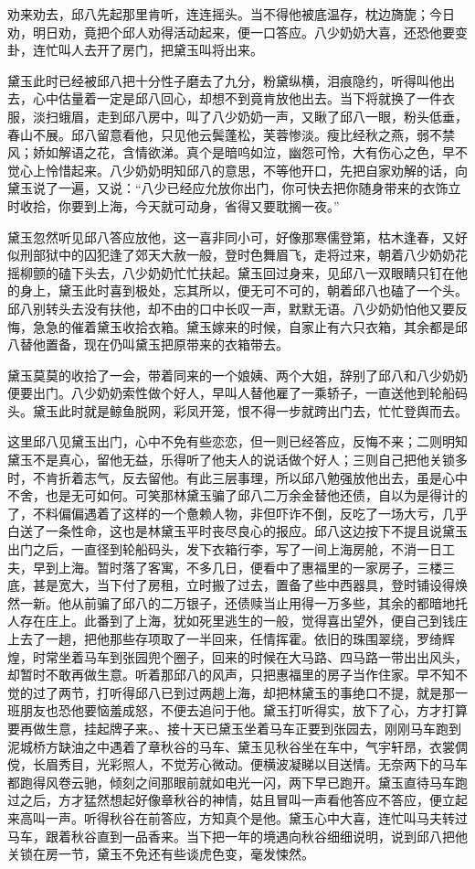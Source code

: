 \documentclass[12pt,UTF8]{ctexbook}
\begin{document}
{{{劝来劝去，邱八先起那里肯听，连连摇头。当不得他被底温存，枕边旖旎；今日劝，明日劝，竟把个邱人劝得活动起来，便一口答应。八少奶奶大喜，还恐他要变卦，连忙叫人去开了房门，把黛玉叫将出来。

黛玉此时已经被邱八把十分性子磨去了九分，粉黛纵横，泪痕隐约，听得叫他出去，心中估量着一定是邱八回心，却想不到竟肯放他出去。当下将就换了一件衣服，淡扫蛾眉，走到邱八房中，叫了八少奶奶一声，又瞅了邱八一眼，粉头低垂，春山不展。邱八留意看他，只见他云鬓蓬松，芙蓉惨淡。瘦比经秋之燕，弱不禁风；娇如解语之花，含情欲涕。真个是暗呜如泣，幽怨可怜，大有伤心之色，早不觉心上怜惜起来。八少奶奶明知邱八的意思，不等他开口，先把自家劝解的话，向黛玉说了一遍，又说：“八少已经应允放你出门，你可快去把你随身带来的衣饰立时收拾，你要到上海，今天就可动身，省得又要耽搁一夜。”

黛玉忽然听见邱八答应放他，这一喜非同小可，好像那寒儒登第，枯木逢春，又好似刑部狱中的囚犯逢了郊天大赦一般，登时色舞眉飞，走将过来，朝着八少奶奶花摇柳颤的磕下头去，八少奶奶忙忙扶起。黛玉回过身来，见邱八一双眼睛只钉在他的身上，黛玉此时喜到极处，忘其所以，便无可不可的，朝着邱八也磕了一个头。邱八别转头去没有扶他，却不由的口中长叹一声，默默无语。八少奶奶怕他又要反悔，急急的催着黛玉收拾衣箱。黛玉嫁来的时候，自家止有六只衣箱，其余都是邱八替他置备，现在仍叫黛玉把原带来的衣箱带去。

黛玉莫莫的收拾了一会，带着同来的一个娘姨、两个大姐，辞别了邱八和八少奶奶便要出门。八少奶奶索性做个好人，早叫人替他雇了一乘轿子，一直送他到轮船码头。黛玉此时就是鲸鱼脱网，彩凤开笼，恨不得一步就跨出门去，忙忙登舆而去。

这里邱八见黛玉出门，心中不免有些恋恋，但一则已经答应，反悔不来；二则明知黛玉不是真心，留他无益，乐得听了他夫人的说话做个好人；三则自己把他关锁多时，不肯折着志气，反去留他。有此三层事理，所以邱八勉强放他出去，虽是心中不舍，也是无可如何。可笑那林黛玉骗了邱八二万余金替他还债，自以为是得计的了，不料偏偏遇着了这样的一个惫赖人物，非但吓诈不倒，反吃了一场大亏，几乎白送了一条性命，这也是林黛玉平时丧尽良心的报应。邱八这边按下不提且说黛玉出门之后，一直径到轮船码头，发下衣箱行李，写了一间上海房舱，不消一日工夫，早到上海。暂时落了客寓，不多几日，便看中了惠福里的一家房子，三楼三底，甚是宽大，当下付了房租，立时搬了过去，置备了些中西器具，登时铺设得焕然一新。他从前骗了邱八的二万银子，还债赎当止用得一万多些，其余的都暗地托人存在庄上。此番到了上海，犹如死里逃生的一般，觉得喜出望外，便自己到钱庄上去了一趟，把他那些存项取了一半回来，任情挥霍。依旧的珠围翠绕，罗绮辉煌，时常坐着马车到张园兜个圈子，回来的时候在大马路、四马路一带出出风头，却暂时不敢再做生意。听着那邱八的风声，只把惠福里的房子当作住家。早不知不觉的过了两节，打听得邱八已到过两趟上海，却把林黛玉的事绝口不提，就是那一班朋友也恐他要恼羞成怒，不便去追问于他。黛玉打听得实，放下了心，方才打算要再做生意，挂起牌子来。、接十天已黛玉坐着马车正要到张园去，刚刚马车跑到泥城桥方缺油之中遇着了章秋谷的马车、黛玉见秋谷坐在车中，气宇轩昂，衣裳倜傥，长眉秀目，光彩照人，不觉芳心微动。便横波凝睇以目送情。无奈两下的马车都跑得风卷云驰，倾刻之间那眼前就如电光一闪，两下早已跑开。黛玉直待马车跑过之后，方才猛然想起好像章秋谷的神情，姑且冒叫一声看他答应不答应，便立起来高叫一声。听得秋谷在前答应，方知真个是他。黛玉心中大喜，连忙叫马夫转过马车，跟着秋谷直到一品香来。当下把一年的境遇向秋谷细细说明，说到邱八把他关锁在房一节，黛玉不免还有些谈虎色变，毫发悚然。

}}}
\end{document}

